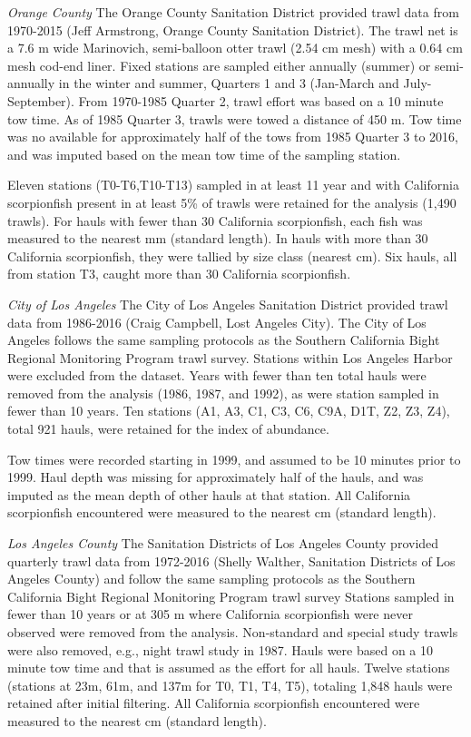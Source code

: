 \documentclass[12pt,]{article}
\begin{document}
\emph{Orange County} The Orange County Sanitation District provided
trawl data from 1970-2015 (Jeff Armstrong, Orange County Sanitation
District). The trawl net is a 7.6 m wide Marinovich, semi-balloon otter
trawl (2.54 cm mesh) with a 0.64 cm mesh cod-end liner. Fixed stations
are sampled either annually (summer) or semi-annually in the winter and
summer, Quarters 1 and 3 (Jan-March and July-September). From 1970-1985
Quarter 2, trawl effort was based on a 10 minute tow time. As of 1985
Quarter 3, trawls were towed a distance of 450 m. Tow time was no
available for approximately half of the tows from 1985 Quarter 3 to
2016, and was imputed based on the mean tow time of the sampling
station.

Eleven stations (T0-T6,T10-T13) sampled in at least 11 year and with
California scorpionfish present in at least 5\% of trawls were retained
for the analysis (1,490 trawls). For hauls with fewer than 30 California
scorpionfish, each fish was measured to the nearest mm (standard
length). In hauls with more than 30 California scorpionfish, they were
tallied by size class (nearest cm). Six hauls, all from station T3,
caught more than 30 California scorpionfish.

\emph{City of Los Angeles} The City of Los Angeles Sanitation District
provided trawl data from 1986-2016 (Craig Campbell, Lost Angeles City).
The City of Los Angeles follows the same sampling protocols as the
Southern California Bight Regional Monitoring Program trawl survey.
Stations within Los Angeles Harbor were excluded from the dataset. Years
with fewer than ten total hauls were removed from the analysis (1986,
1987, and 1992), as were station sampled in fewer than 10 years. Ten
stations (A1, A3, C1, C3, C6, C9A, D1T, Z2, Z3, Z4), total 921 hauls,
were retained for the index of abundance.

Tow times were recorded starting in 1999, and assumed to be 10 minutes
prior to 1999. Haul depth was missing for approximately half of the
hauls, and was imputed as the mean depth of other hauls at that station.
All California scorpionfish encountered were measured to the nearest cm
(standard length).

\emph{Los Angeles County} The Sanitation Districts of Los Angeles County
provided quarterly trawl data from 1972-2016 (Shelly Walther, Sanitation
Districts of Los Angeles County) and follow the same sampling protocols
as the Southern California Bight Regional Monitoring Program trawl
survey Stations sampled in fewer than 10 years or at 305 m where
California scorpionfish were never observed were removed from the
analysis. Non-standard and special study trawls were also removed, e.g.,
night trawl study in 1987. Hauls were based on a 10 minute tow time and
that is assumed as the effort for all hauls. Twelve stations (stations
at 23m, 61m, and 137m for T0, T1, T4, T5), totaling 1,848 hauls were
retained after initial filtering. All California scorpionfish
encountered were measured to the nearest cm (standard length).
\end{document}
